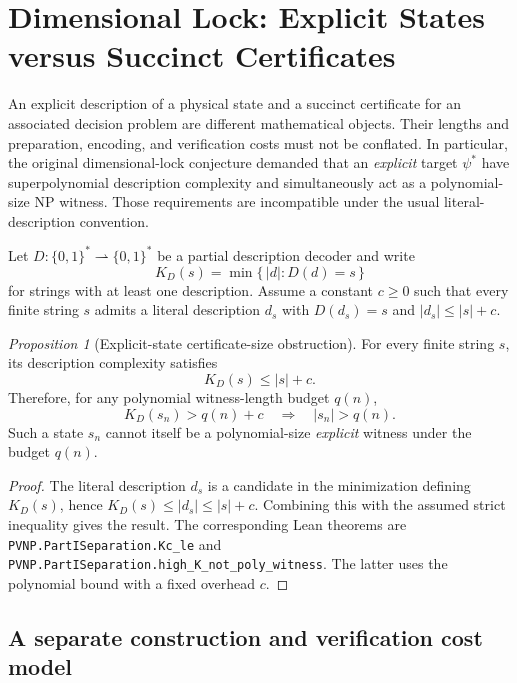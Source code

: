 \documentclass[12pt]{article}
\theoremstyle{remark}
\newtheorem{proposition}[theorem]{Proposition}
\begin{document}
\section{Dimensional Lock: Explicit States versus Succinct Certificates}
\label{sec:dim-lock}

An explicit description of a physical state and a succinct certificate
for an associated decision problem are different mathematical objects.
Their lengths and preparation, encoding, and verification costs must
not be conflated. In particular, the original dimensional-lock
conjecture demanded that an \emph{explicit} target $\psi^*$ have
superpolynomial description complexity and simultaneously act as a
polynomial-size NP witness. Those requirements are incompatible under
the usual literal-description convention.

Let $D:\{0,1\}^*\rightharpoonup\{0,1\}^*$ be a partial description
decoder and write
\[
 K_D(s)=\min\{\,|d|:D(d)=s\,\}
\]
for strings with at least one description. Assume a constant
$c\ge0$ such that every finite string $s$ admits a literal
description $d_s$ with $D(d_s)=s$ and $|d_s|\le |s|+c$.

\begin{proposition}[Explicit-state certificate-size obstruction]
\label{prop:explicit-state-witness-size}
For every finite string $s$, its description complexity satisfies
\[
 K_D(s)\le |s|+c.
\]
Therefore, for any polynomial witness-length budget $q(n)$,
\[
 K_D(s_n)>q(n)+c
 \quad\Longrightarrow\quad
 |s_n|>q(n).
\]
Such a state $s_n$ cannot itself be a polynomial-size \emph{explicit}
witness under the budget $q(n)$.
\end{proposition}

\begin{proof}
The literal description $d_s$ is a candidate in the minimization
defining $K_D(s)$, hence $K_D(s)\le |d_s|\le |s|+c$.
Combining this with the assumed strict inequality gives the result.
The corresponding Lean theorems are
\nolinkurl{PVNP.PartISeparation.Kc_le} and
\nolinkurl{PVNP.PartISeparation.high_K_not_poly_witness}.
The latter uses the polynomial bound with a fixed overhead $c$.
\end{proof}

\subsection{A separate construction and verification cost model}
\end{document}
